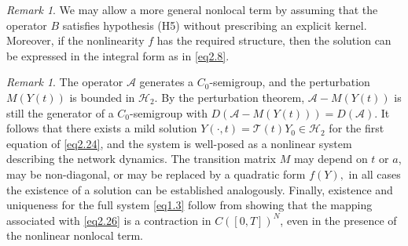 \documentclass[10pt, a4paper]{amsart}
\newcounter{assu}
\theoremstyle{plain}
\theoremstyle{definition}
\theoremstyle{remark}
\newtheorem{remark}[lemma]{Remark}
\numberwithin{equation}{section}
\begin{document}
\begin{remark}
We may allow a more general nonlocal term by assuming that the operator $B$ satisfies hypothesis (H5) without prescribing an explicit kernel. Moreover, if the nonlinearity $f$ has the required structure, then the solution can be expressed in the integral form as in \eqref{eq2.8}.
\end{remark}
\begin{remark} 
The operator $\mathcal{A}$ generates a $C_0$-semigroup, and the perturbation $M(Y(t))$ is bounded in $\mathcal{H}_2$. By the perturbation theorem, $\mathcal{A}-M(Y(t))$ is still the generator of a $C_0$-semigroup with $D(\mathcal{A}-M(Y(t)))=D(\mathcal{A})$. It follows that there exists a mild solution $Y(\cdot,t)=\mathcal{T}(t)Y_0\in\mathcal{H}_2$ for the first equation of \eqref{eq2.24}, and the system is well-posed as a nonlinear system describing the network dynamics. The transition matrix $M$ may depend on $t$ or $a$, may be non-diagonal, or may be replaced by a quadratic form $f(Y),$ in all cases the existence of a solution can be established analogously. Finally, existence and uniqueness for the full system \eqref{eq1.3} follow from showing that the mapping associated with \eqref{eq2.26} is a contraction in $C([0,T])^N$, even in the presence of the nonlinear nonlocal term.
\end{remark}
\end{document}
